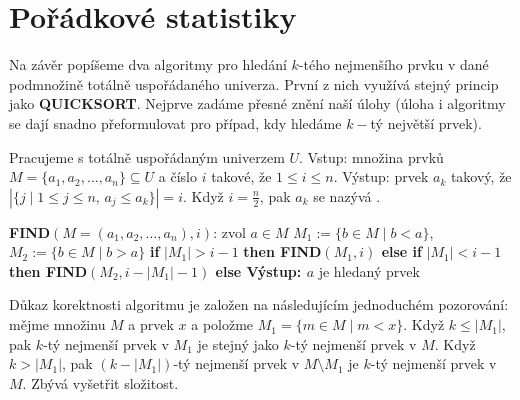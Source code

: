 \documentclass[a4paper,12pt]{article}
\def \emph#1{\underbar{#1}}
\begin{document}
\section{{Pořádkové statistiky}}

Na závěr popíšeme dva algoritmy pro hledání $
k$-tého 
nejmenší\-ho prvku v dané podmnožině totálně 
uspořádané\-ho univerza. Prv\-ní z nich využívá  
stejný princip jako {\bf QUICKSORT}. Nejprve zadáme 
přesné zně\-ní naší úlohy (úloha i algoritmy se dají 
snadno přeformulovat pro případ, kdy hledáme $k-$tý 
největší prvek).

Pracujeme s totálně uspořádaným univerzem $
U$.\newline 
Vstup: množina prvků $M=\{a_1,a_2,\dots,a_n\}\subseteq 
U$ a číslo $i$ takové, 
že $1\le i\le n$.\newline 
Výstup: prvek $a_k$ takový, že 
$|\{j\mid 1\le j\le n,\,a_j\le a_k\}|=i$.\newline 
Když $i=\frac n2$, pak $a_k$ se nazývá \emph{medián}.

{\bf FIND$(M=(a_1,a_2,\dots,a_n),i)$}:\newline 
zvol $a\in M$\newline
$M_1:=\{b\in M\mid b<a\}$, 
$M_2:=\{b\in M\mid b>a\}$\newline 
{\bf if} $|M_1|>i-1$ {\bf then\newline 
\phantom{{\rm ---}}FIND$(M_1,i)$\newline 
else\newline 
\phantom{{\rm ---}}if} $|M_1|<i-1$ {\bf then\newline 
\phantom{{\rm ------}}FIND$(M_2,i-|M_1|-1)$\newline 
\phantom{{\rm ---}}else\newline 
\phantom{{\rm------}}Výstup: $a$} je hledaný prvek\newline 
\phantom{---}{\bf endif\newline 
endif}

Důkaz korektnosti algoritmu je založen na následujícím 
jednoduchém pozorování: mějme množinu $M$ a prvek $
x$ a 
položme $M_1=\{m\in M\mid m<x\}$. Když $k\le |M_1|$, pak $k$-tý 
nejmenší 
prvek v $M_1$ je stejný jako $k$-tý nejmenší prvek v $
M$. Když 
$k>|M_1|$, pak $(k-|M_1|)$-tý nejmenší prvek v $M\setminus 
M_1$ je $k$-tý 
nejmenší prvek v $M$.  
Zbývá vyšetřit složitost.
\end{document}
